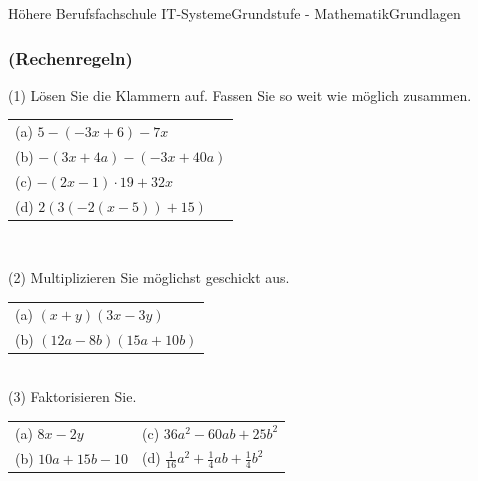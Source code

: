 \documentclass[11pt,twocolumn,oneside,openany,headings=optiontotoc,11pt,numbers=noenddot]{article}
\begin{document}
\begin{worksheet}{Höhere Berufsfachschule IT-Systeme}{Grundstufe - Mathematik}{Grundlagen}
		\subsubsection*{(Rechenregeln)}
		(1) Lösen Sie die Klammern auf. Fassen Sie so weit wie möglich zusammen.\\
		\begin{tabularx}{0.5\textwidth}{X}
			(a) \(5-(-3x+6)-7x\)\\
			(b) \(-(3x+4a)-(-3x+40a)\)\\
			(c) \(-(2x-1)\cdot{}19 + 32x\)\\
			(d) \(2(3(-2(x-5))+15)\)
		\end{tabularx}\\
		\par\bigskip\noindent
		(2) Multiplizieren Sie möglichst geschickt aus.\\
		\begin{tabularx}{0.5\textwidth}{X}
			(a) \((x+y)(3x-3y)\)\\
			(b) \((12a-8b)(15a+10b)\)
		\end{tabularx}\\
		\newpage
		(3) Faktorisieren Sie.\\
		\begin{tabularx}{0.5\textwidth}{XX}
			(a) \(8x-2y\) & (c) \(36a^2 - 60ab +25b^2\)\\
			(b) \(10a + 15b -10\) & (d) \(\frac{1}{16}a^2 + \frac{1}{4}ab + \frac{1}{4}b^2\)
		\end{tabularx}

\end{worksheet}
\end{document}
